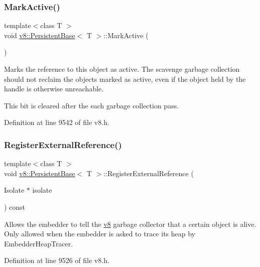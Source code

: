 \subsubsection{\texorpdfstring{Mark\+Active()}{MarkActive()}}
{\footnotesize\ttfamily template$<$class T $>$ \\
void \mbox{\hyperlink{classv8_1_1PersistentBase}{v8\+::\+Persistent\+Base}}$<$ T $>$\+::Mark\+Active (\begin{DoxyParamCaption}{ }\end{DoxyParamCaption})}

Marks the reference to this object as active. The scavenge garbage collection should not reclaim the objects marked as active, even if the object held by the handle is otherwise unreachable.

This bit is cleared after the each garbage collection pass. 

Definition at line 9542 of file v8.\+h.

\mbox{\label{classv8_1_1PersistentBase_a427ad28478a6a208605fca3d39ce4bdf}} 
\subsubsection{\texorpdfstring{Register\+External\+Reference()}{RegisterExternalReference()}}
{\footnotesize\ttfamily template$<$class T $>$ \\
void \mbox{\hyperlink{classv8_1_1PersistentBase}{v8\+::\+Persistent\+Base}}$<$ T $>$\+::Register\+External\+Reference (\begin{DoxyParamCaption}\item[{Isolate $\ast$}]{isolate }\end{DoxyParamCaption}) const}

Allows the embedder to tell the \mbox{\hyperlink{namespacev8}{v8}} garbage collector that a certain object is alive. Only allowed when the embedder is asked to trace its heap by Embedder\+Heap\+Tracer. 

Definition at line 9526 of file v8.\+h.

\mbox{\label{classv8_1_1PersistentBase_a174bb1e45b18fd4eeaee033622825bb8}} 
